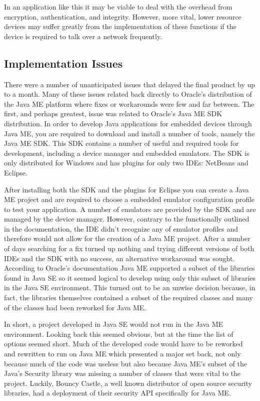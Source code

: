 In an application like this it may be viable to deal with the overhead from encryption, authentication, and integrity. However, more vital, lower resource devices may suffer greatly from the implementation of these functions if the device is required to talk over a network frequently. 

\subsection{Implementation Issues}
There were a number of unanticipated issues that delayed the final product by up to a month. Many of these issues related back directly to Oracle's distribution of the Java ME platform where fixes or workarounds were few and far between. The first, and perhaps greatest, issue was related to Oracle's Java ME SDK distribution. In order to develop Java applications for embedded devices through Java ME, you are required to download and install a number of tools, namely the Java ME SDK. This SDK contains a number of useful and required tools for development, including a device manager and embedded emulators. The SDK is only distributed for Windows and has plugins for only  two IDEs: NetBeans and Eclipse.

 After installing both the SDK and the plugins for Eclipse you can create a Java ME project and are required to choose a embedded emulator configuration profile to test your application. A number of emulators are provided by the SDK and are managed by the device manager. However, contrary to the functionally outlined in the documentation, the IDE didn't recognize any of emulator profiles and therefore would not allow for the creation of a Java ME project. After a number of days searching for a fix turned up nothing and trying different versions of both IDEs and the SDK with no success, an alternative workaround was sought. According to Oracle's documentation Java ME supported a subset of the libraries found in Java SE so it seemed logical to develop using only this subset of libraries in the Java SE environment. This turned out to be an unwise decision because, in fact, the libraries themselves contained a subset of the required classes and many of the classes had been reworked for Java ME.
 
 In short, a project developed in Java SE would not run in the Java ME environment. Looking back this seemed obvious, but at the time the list of options seemed short. Much of the developed code would have to be reworked and rewritten to run on Java ME which presented a major set back, not only because much of the code was useless but also because Java ME's subset of the Java's Security library was missing a number of classes that were vital to the project. Luckily, Bouncy Castle, a well known distributor of open source security libraries, had a deployment of their security API specifically for Java ME. 
 
